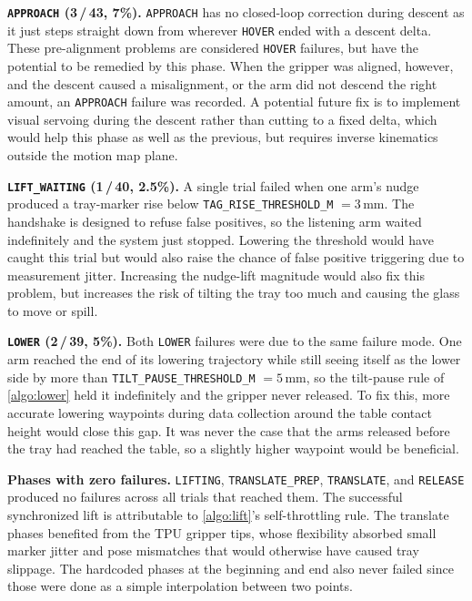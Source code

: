 \textbf{\texttt{APPROACH} (3\,/\,43, 7\%).} \texttt{APPROACH} has no closed-loop correction during descent as it just steps straight down from wherever \texttt{HOVER} ended with a descent delta. These pre-alignment problems are considered \texttt{HOVER} failures, but have the potential to be remedied by this phase. When the gripper was aligned, however, and the descent caused a misalignment, or the arm did not descend the right amount, an \texttt{APPROACH} failure was recorded. A potential future fix is to implement visual servoing during the descent rather than cutting to a fixed delta, which would help this phase as well as the previous, but requires inverse kinematics outside the motion map plane.

\textbf{\texttt{LIFT\_WAITING} (1\,/\,40, 2.5\%).} A single trial failed when one arm's nudge produced a tray-marker rise below \texttt{TAG\_RISE\_THRESHOLD\_M} $= 3$\,mm. The handshake is designed to refuse false positives, so the listening arm waited indefinitely and the system just stopped. Lowering the threshold would have caught this trial but would also raise the chance of false positive triggering due to measurement jitter. Increasing the nudge-lift magnitude would also fix this problem, but increases the risk of tilting the tray too much and causing the glass to move or spill.

\textbf{\texttt{LOWER} (2\,/\,39, 5\%).} Both \texttt{LOWER} failures were due to the same failure mode. One arm reached the end of its lowering trajectory while still seeing itself as the lower side by more than \texttt{TILT\_PAUSE\_THRESHOLD\_M} $= 5$\,mm, so the tilt-pause rule of \cref{algo:lower} held it indefinitely and the gripper never released. To fix this, more accurate lowering waypoints during data collection around the table contact height would close this gap. It was never the case that the arms released before the tray had reached the table, so a slightly higher waypoint would be beneficial.

\textbf{Phases with zero failures.} \texttt{LIFTING}, \texttt{TRANSLATE\_PREP}, \texttt{TRANSLATE}, and \texttt{RELEASE} produced no failures across all trials that reached them. The successful synchronized lift is attributable to \cref{algo:lift}'s self-throttling rule. The translate phases benefited from the TPU gripper tips, whose flexibility absorbed small marker jitter and pose mismatches that would otherwise have caused tray slippage. The hardcoded phases at the beginning and end also never failed since those were done as a simple interpolation between two points.



